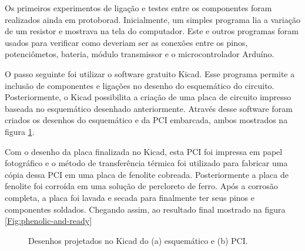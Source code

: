 \documentclass[
	12pt,				%
	openright,			%
	oneside,			%
	a4paper,			%
	english,			%
	brazil				%
	]{abntex2}
\begin{document}
			Os primeiros experimentos de ligação e testes entre os componentes foram realizados ainda em protoborad. Inicialmente, um simples programa lia a variação de um resistor e mostrava na tela do computador. Este e outros programas foram usados para verificar como deveriam ser as conexões entre os pinos, potenciômetos, bateria, módulo transmissor e o microcontrolador Arduíno.

			O passo seguinte foi utilizar o software gratuito Kicad. Esse programa permite a inclusão de componentes e ligações no desenho do esquemático do circuito. Posteriormente, o Kicad possibilita a criação de uma placa de circuito impresso baseada no esquemático desenhado anteriormente. Através desse software foram criados os desenhos do esquemático e da PCI embarcada, ambos mostrados na figura \ref{Fig:schematic-and-PCB}.

			Com o desenho da placa finalizada no Kicad, esta PCI foi impressa em papel fotográfico e o método de transferência térmica foi utilizado para fabricar uma cópia dessa PCI em uma placa de fenolite cobreada. Posteriormente a placa de fenolite foi corroída em uma solução de percloreto de ferro. Após a corrosão completa, a placa foi lavada e secada para finalmente ter seus pinos e componentes soldados. Chegando assim, ao resultado final mostrado na figura \ref{Fig:phenolic-and-ready}

	\begin{figure}[!htb]
		 \centering
		 \caption{ Desenhos projetados no Kicad do (a) esquemático e (b) PCI. }
		 \centering
		 \label{Fig:schematic-and-PCB}
	\end{figure}
\end{document}
